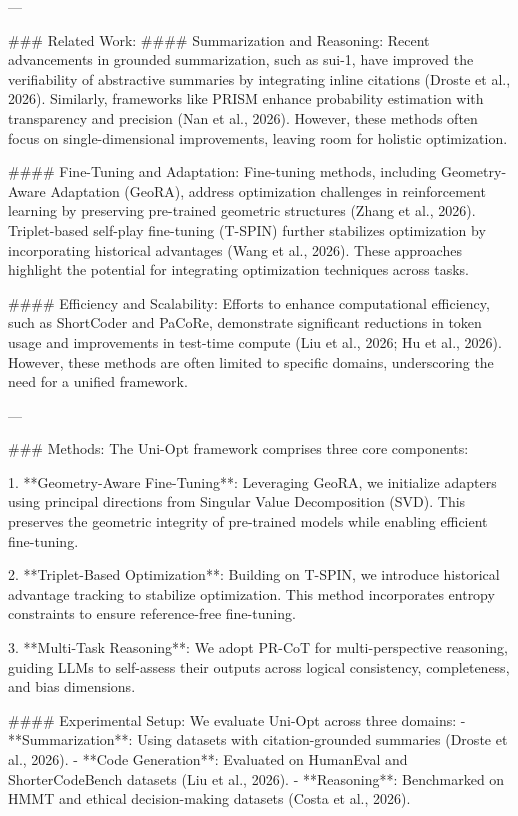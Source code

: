 ---

### Related Work:  
#### Summarization and Reasoning:  
Recent advancements in grounded summarization, such as sui-1, have improved the verifiability of abstractive summaries by integrating inline citations (Droste et al., 2026). Similarly, frameworks like PRISM enhance probability estimation with transparency and precision (Nan et al., 2026). However, these methods often focus on single-dimensional improvements, leaving room for holistic optimization.

#### Fine-Tuning and Adaptation:  
Fine-tuning methods, including Geometry-Aware Adaptation (GeoRA), address optimization challenges in reinforcement learning by preserving pre-trained geometric structures (Zhang et al., 2026). Triplet-based self-play fine-tuning (T-SPIN) further stabilizes optimization by incorporating historical advantages (Wang et al., 2026). These approaches highlight the potential for integrating optimization techniques across tasks.

#### Efficiency and Scalability:  
Efforts to enhance computational efficiency, such as ShortCoder and PaCoRe, demonstrate significant reductions in token usage and improvements in test-time compute (Liu et al., 2026; Hu et al., 2026). However, these methods are often limited to specific domains, underscoring the need for a unified framework.

---

### Methods:  
The Uni-Opt framework comprises three core components:  

1. **Geometry-Aware Fine-Tuning**:  
   Leveraging GeoRA, we initialize adapters using principal directions from Singular Value Decomposition (SVD). This preserves the geometric integrity of pre-trained models while enabling efficient fine-tuning.  
   
2. **Triplet-Based Optimization**:  
   Building on T-SPIN, we introduce historical advantage tracking to stabilize optimization. This method incorporates entropy constraints to ensure reference-free fine-tuning.

3. **Multi-Task Reasoning**:  
   We adopt PR-CoT for multi-perspective reasoning, guiding LLMs to self-assess their outputs across logical consistency, completeness, and bias dimensions.

#### Experimental Setup:  
We evaluate Uni-Opt across three domains:  
- **Summarization**: Using datasets with citation-grounded summaries (Droste et al., 2026).  
- **Code Generation**: Evaluated on HumanEval and ShorterCodeBench datasets (Liu et al., 2026).  
- **Reasoning**: Benchmarked on HMMT and ethical decision-making datasets (Costa et al., 2026).  

